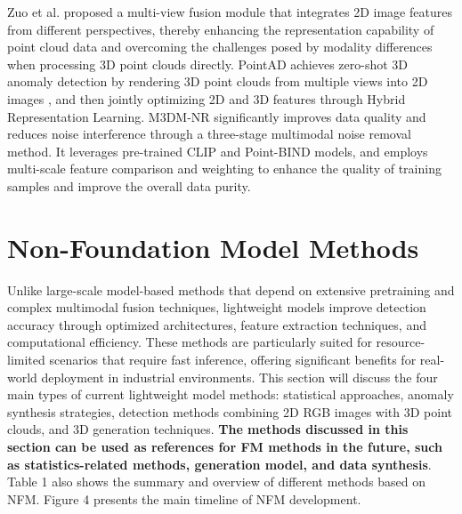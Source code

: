 \documentclass[journal,comsoc]{IEEEtran}
\begin{document}
Zuo et al. \cite{zuo2024clip3d} proposed a multi-view fusion module that integrates 2D image features from different perspectives, thereby enhancing the representation capability of point cloud data and overcoming the challenges posed by modality differences when processing 3D point clouds directly. PointAD \cite{zhou2024pointad} achieves zero-shot 3D anomaly detection by rendering 3D point clouds from multiple views into 2D images \cite{zhang2022pointclip}, and then jointly optimizing 2D and 3D features through Hybrid Representation Learning. M3DM-NR \cite{wang2024m3dm} significantly improves data quality and reduces noise interference through a three-stage multimodal noise removal method. It leverages pre-trained CLIP and Point-BIND models, and employs multi-scale feature comparison and weighting to enhance the quality of training samples and improve the overall data purity.



\section{Non-Foundation Model Methods}
Unlike large-scale model-based methods that depend on extensive pretraining and complex multimodal fusion techniques, lightweight models improve detection accuracy through optimized architectures, feature extraction techniques, and computational efficiency. These methods are particularly suited for resource-limited scenarios that require fast inference, offering significant benefits for real-world deployment in industrial environments. This section will discuss the four main types of current lightweight model methods: statistical approaches, anomaly synthesis strategies, detection methods combining 2D RGB images with 3D point clouds, and 3D generation techniques. \textbf{The methods discussed in this section can be used as references for FM methods in the future, such as statistics-related methods, generation model, and data synthesis}.
Table 1 also shows the summary and overview of different methods based on NFM. Figure 4 presents the main timeline of NFM development.
\end{document}
